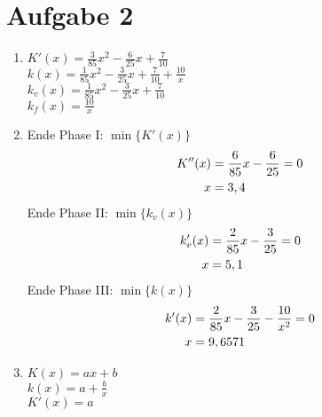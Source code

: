 \documentclass{article}
\begin{document}
	\section*{Aufgabe 2}
	\begin{enumerate}[label=(\alph*)]
		\item $K'(x) = \frac{3}{85}x^2 - \frac{6}{25}x + \frac{7}{10}$ \\
		$k(x) = \frac{1}{85}x^2 - \frac{3}{25}x + \frac{7}{10} + \frac{10}{x}$ \\
		$k_v(x) = \frac{1}{85}x^2 - \frac{3}{25}x + \frac{7}{10}$ \\
		$k_f(x) = \frac{10}{x}$
		\item Ende Phase I: $\min\{K'(x)\}$
		\begin{align}
			K''(x) &= \frac{6}{85}x - \frac{6}{25} = 0 \notag \\
			x &= 3,4 \notag
		\end{align}
		Ende Phase II: $\min\{k_v(x)\}$
		\begin{align}
			k'_v(x) &= \frac{2}{85}x - \frac{3}{25} = 0 \notag \\
			x &= 5,1 \notag
		\end{align}
		Ende Phase III: $\min\{k(x)\}$
		\begin{align}
			k'(x) &= \frac{2}{85}x - \frac{3}{25} - \frac{10}{x^2} = 0 \notag \\
			x &= 9,6571 \notag
		\end{align}
		\item $K(x) = ax + b$ \\
		$k(x) = a + \frac{b}{x}$ \\
		$K'(x) = a$
	\end{enumerate}
	
\end{document}
